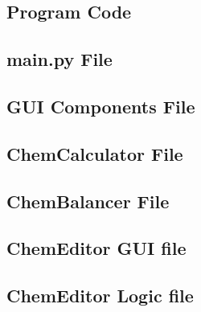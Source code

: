 \documentclass[a4paper,12pt]{article}
\begin{document}
\newpage
\begin{appendices}

\section{Program Code}

\subsection{main.py File}




\subsection{GUI Components File}




\newpage

\subsection{ChemCalculator File}


\newpage

\subsection{ChemBalancer File}



\newpage

\subsection{ChemEditor GUI file}



\newpage

\subsection{ChemEditor Logic file}


\end{appendices}
\end{document}

